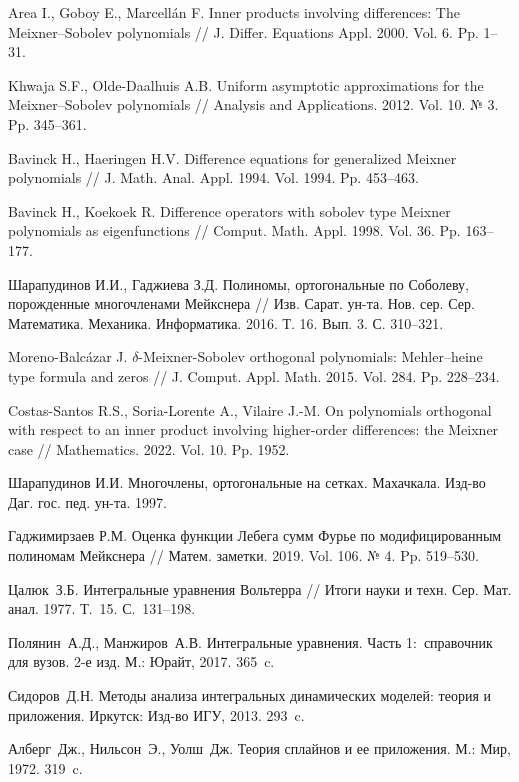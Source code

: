 \begin{thebibliography}{111}
{Area I., Goboy E., Marcell\'an F.} Inner products involving differences: The Meixner–Sobolev polynomials // J. Differ. Equations Appl. 2000. Vol. 6. Pp. 1--31.

{Khwaja S.F., Olde-Daalhuis A.B.} Uniform asymptotic approximations for the Meixner–Sobolev polynomials // Analysis and Applications. 2012. Vol. 10. № 3. Pp. 345--361.

{Bavinck H., Haeringen H.V.} Difference equations for generalized Meixner polynomials // J. Math. Anal. Appl. 1994. Vol. 1994. Pp. 453--463.

{Bavinck H., Koekoek R.} Difference operators with sobolev type Meixner polynomials as eigenfunctions // Comput. Math. Appl. 1998. Vol. 36. Pp. 163--177.

{Шарапудинов И.И., Гаджиева З.Д.} Полиномы, ортогональные по Соболеву, порожденные многочленами Мейкснера // Изв. Сарат. ун-та. Нов. сер. Сер. Математика. Механика. Информатика. 2016. Т. 16. Вып. 3. С. 310--321.

{Moreno-Balc\'azar J.} $\delta$-Meixner-Sobolev orthogonal polynomials: Mehler–heine type formula and zeros // J. Comput. Appl. Math. 2015. Vol. 284. Pp. 228--234.

{Costas-Santos R.S., Soria-Lorente A., Vilaire J.-M.} On polynomials orthogonal with respect to an inner product involving higher-order differences: the Meixner case // Mathematics. 2022. Vol. 10. Pp. 1952.

{Шарапудинов И.И.} Многочлены, ортогональные на сетках. Махачкала. Изд-во Даг. гос. пед. ун-та. 1997.

{Гаджимирзаев Р.М.} Оценка функции Лебега сумм Фурье по модифицированным полиномам Мейкснера // Матем. заметки. 2019. Vol. 106. № 4. Pp. 519--530.


 Цалюк~З.Б. Интегральные уравнения Вольтерра //
Итоги науки и техн. Сер. Мат. анал. 1977. Т.~15.
С.~131--198.

 Полянин~А.Д., Манжиров~А.В.
Интегральные уравнения. Часть 1:~справочник для вузов.  2-е изд.
М.: Юрайт, 2017. 365~c.

 Сидоров~Д.Н. Методы анализа интегральных динамических
моделей: теория и приложения.  Иркутск: Изд-во ИГУ, 2013. 293~c.

 Алберг~Дж., Нильсон~Э., Уолш~Дж. Теория сплайнов и ее приложения. М.: Мир, 1972. 319~c.


\end{thebibliography}
